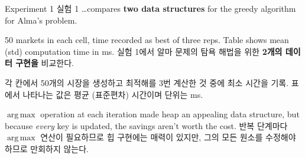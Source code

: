 \documentclass[11pt,mathserif,notheorems]{beamer}
\theoremstyle{definition}
\theoremstyle{definition}
\DeclareMathOperator*{\argmax}{arg\,max}
\begin{document}
\begin{frame}{\ifen Experiment 1 \else 실험 1 \fi}
\ifen 
\dots compares \textbf{two data structures} for the greedy algorithm for Alma's problem. 
 
50 markets in each cell, time recorded as best of three reps. Table shows mean (std) computation time in ms.
\else
실험 1에서 알마 문제의 탐욕 해법을 위한 \textbf{2개의 데이터 구현을} 비교한다.

각 칸에서 50개의 시장을 생성하고 최적해를 3번 계산한 것 중에 최소 시간을 기록. 표에서 나타나는 값은 평균 (표준편차) 시간이며 단위는 ms.
\fi
\begin{center}
\end{center}
\ifen 
$\argmax$ operation at each iteration made heap an appealing data structure, but because \emph{every} key is updated, the savings aren't worth the cost.
\else 
반복 단계마다 $\argmax$ 연산이 필요하므로 힙 구현에는 매력이 있지만, 그의 모든 원소를 수정해야 하므로 만회하지 않는다.
\fi

\end{frame}
\end{document}
